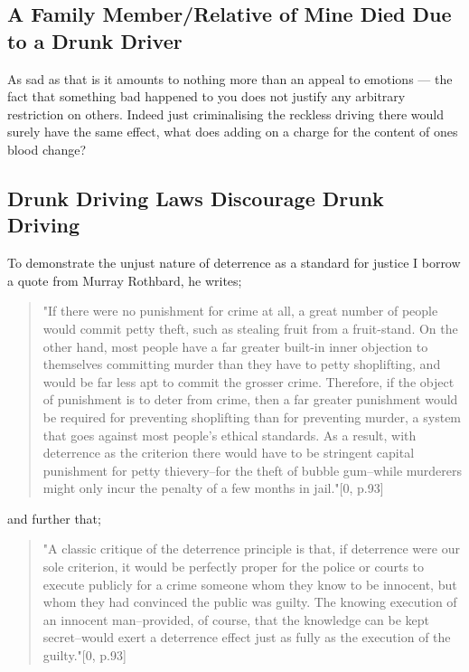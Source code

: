 \documentclass[11pt]{article}
\begin{document}
\subsection{A Family Member/Relative of Mine Died Due to a Drunk Driver}
\label{sec:org3f21191}

As sad as that is it amounts to nothing more than an appeal to emotions --- the fact that something bad happened to you does not justify any arbitrary restriction on others. Indeed just criminalising the reckless driving there would surely have the same effect, what does adding on a charge for the content of ones blood change?


\subsection{Drunk Driving Laws Discourage Drunk Driving}
\label{sec:org535cb3a}

To demonstrate the unjust nature of deterrence as a standard for justice I borrow a quote from Murray Rothbard, he writes;

\begin{quote}
"If there were no punishment for crime at all, a great number of people would commit petty theft, such as stealing fruit from a fruit-stand. On the other hand, most people have a far greater built-in inner objection to themselves committing murder than they have to petty shoplifting, and would be far less apt to commit the grosser crime. Therefore, if the object of punishment is to deter from crime, then a far greater punishment would be required for preventing shoplifting than for preventing murder, a system that goes against most people's ethical standards. As a result, with deterrence as the criterion there would have to be stringent capital punishment for petty thievery--for the theft of bubble gum--while murderers might only incur the penalty of a few months in jail."[0, p.93]
\end{quote}

and further that;

\begin{quote}
"A classic critique of the deterrence principle is that, if deterrence were our sole criterion, it would be perfectly proper for the police or courts to execute publicly for a crime someone whom they know to be innocent, but whom they had convinced the public was guilty. The knowing execution of an innocent man--provided, of course, that the knowledge can be kept secret--would exert a deterrence effect just as fully as the execution of the guilty."[0, p.93]
\end{quote}
\end{document}
